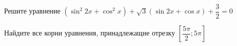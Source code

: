 \begin{ex}
	\begin{condition}
		\begin{enumcols}[label=\asbuk*)]
			\item Решите уравнение \( \left(\sin^2 2x + \cos^2 x\right)+\sqrt{3}(\sin 2x + \cos x)+\dfrac{3}{2} = 0 \)
			\item Найдите все корни уравнения, принадлежащие отрезку \( \left[\dfrac{5\pi}{2};5\pi\right] \)
		\end{enumcols}
	\end{condition}
\end{ex}